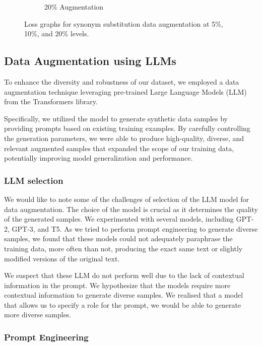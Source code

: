 \documentclass{article}
\begin{document}
\begin{figure}[h]
\begin{subfigure}[b]{0.3\textwidth}
    \caption{20\% Augmentation}
    \label{fig:synonym_loss_20}
  \end{subfigure}
  \caption{Loss graphs for synonym substitution data augmentation at 5\%, 10\%, and 20\% levels.}
  \label{fig:synonym_substitution_loss}
\end{figure}

\subsection{Data Augmentation using LLMs}

To enhance the diversity and robustness of our dataset, we employed a data
augmentation technique leveraging pre-trained Large Language Models (LLM) from
the Transformers library.

Specifically, we utilized the model to generate synthetic data samples by
providing prompts based on existing training examples. By carefully controlling
the generation parameters, we were able to produce high-quality, diverse, and
relevant augmented samples that expanded the scope of our training data,
potentially improving model generalization and performance.

\subsubsection{LLM selection}

We would like to note some of the challenges of selection of the LLM model for
data augmentation. The choice of the model is crucial as it determines the
quality of the generated samples. We experimented with several models,
including GPT-2, GPT-3, and T5. As we tried to perform prompt engineering to
generate diverse samples, we found that these models could not adequately
paraphrase the training data, more often than not, producing the exact same
text or slightly modified versions of the original text.

We suspect that these LLM do not perform well due to the lack of contextual
information in the prompt. We hypothesize that the models require more
contextual information to generate diverse samples. We realised that a model
that allows us to specify a role for the prompt, we would be able to generate
more diverse samples.

\subsubsection{Prompt Engineering}
\end{document}
